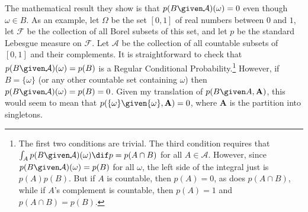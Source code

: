The mathematical result they show is that $p(B \given \mathcal{A})(\omega)=0$ even though $\omega\in B$. As an example, let $\Omega$ be the set $[0,1]$ of real numbers between $0$ and $1$, let $\mathcal{F}$ be the collection of all Borel subsets of this set, and let $p$ be the standard Lebesgue measure on $\mathcal{F}$. Let $\mathcal{A}$ be the collection of all countable subsets of $[0,1]$ and their complements. It is straightforward to check that $p(B \given \mathcal{A})(\omega)=p(B)$ is a Regular Conditional Probability.\footnote{The first two conditions are trivial. The third condition requires that $\int_A p(B \given \mathcal{A})(\omega) \dif p=p(A\cap B)$ for all $A\in\mathcal{A}$. However, since $p(B \given \mathcal{A})(\omega)=p(B)$ for all $\omega$, the left side of the integral just is $p(A)p(B)$. But if $A$ is countable, then $p(A)=0$, as does $p(A\cap B)$, while if $A$'s complement is countable, then $p(A)=1$ and $p(A\cap B)=p(B)$.} However, if $B=\{\omega\}$ (or any other countable set containing $\omega$) then $p(B \given \mathcal{A})(\omega)=p(B)=0$. Given my translation of $p(B \given A,\mathbf{A})$, this would seem to mean that $p(\{\omega\} \given \{\omega\},\mathbf{A})=0$, where $\mathbf{A}$ is the partition into singletons.\label{countgen}

